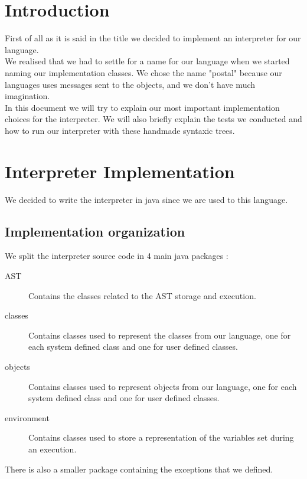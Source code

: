 \documentclass{eplDoc}
\begin{document}
\maketitle
\newpage

\section{Introduction}
First of all as it is said in the title we decided to implement an interpreter for our language.  \\
We realised that we had to settle for a name for our language when we started naming our implementation classes. We chose the name "postal" because our languages uses messages sent to the objects, and we don't have much imagination. \\ 
In this document we will try to explain our most important implementation choices for the interpreter. We will also briefly explain the tests we conducted and how to run our interpreter with these handmade syntaxic trees. 

\section{Interpreter Implementation}
We decided to write the interpreter in java since we are used to this language. 

\subsection{Implementation organization}

We split the interpreter source code in 4 main java packages : 
\begin{description}
	\item[AST] Contains the classes related to the AST storage and execution. 
	\item[classes] Contains classes used to represent the classes from our language, one for each system defined class and one for user defined classes. 
	\item[objects] Contains classes used to represent objects from our language, one for each system defined class and one for user defined classes. 
	\item[environment] Contains classes used to store a representation of the variables set during an execution. 
\end{description}
There is also a smaller package containing the exceptions that we defined. 
\end{document}
